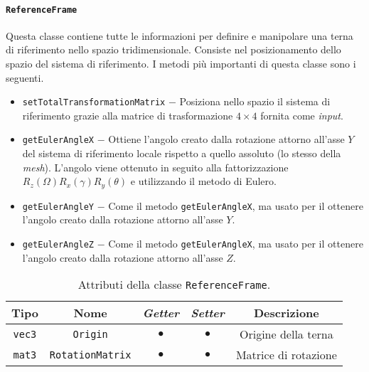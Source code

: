 \paragraph{\texttt{ReferenceFrame}}
Questa classe contiene tutte le informazioni per definire e manipolare una terna di riferimento nello spazio tridimensionale. Consiste nel posizionamento dello spazio del sistema di riferimento. I metodi più importanti di questa classe sono i seguenti.
\begin{itemize}
	\item \texttt{setTotalTransformationMatrix} $-$ Posiziona nello spazio il sistema di riferimento grazie alla matrice di trasformazione $4\times4$ fornita come \textit{input}.
	\item \texttt{getEulerAngleX} $-$ Ottiene l'angolo creato dalla rotazione attorno all'asse $Y$ del sistema di riferimento locale rispetto a quello assoluto (lo stesso della \textit{mesh}). L'angolo viene ottenuto in seguito alla fattorizzazione $R_z(\Omega) R_x(\gamma) R_y(\theta)$ e utilizzando il metodo di Eulero.
	\item \texttt{getEulerAngleY} $-$ Come il metodo \texttt{getEulerAngleX}, ma usato per il ottenere l'angolo creato dalla rotazione attorno all'asse $Y$.
	\item \texttt{getEulerAngleZ} $-$ Come il metodo \texttt{getEulerAngleX}, ma usato per il ottenere l'angolo creato dalla rotazione attorno all'asse $Z$.
\end{itemize}
\begin{table}[h!]
	\centering
	\begin{tabular}{|c|c|c|c|c|}
		\hline 
		\textbf{Tipo} & \textbf{Nome} & \textit{\textbf{Getter}} & \textit{\textbf{Setter}} & \textbf{Descrizione} \\ \hline 
		\texttt{vec3} & \texttt{Origin} & $\bullet$ & $\bullet$ & Origine della terna \\ \hline 
		\texttt{mat3} & \texttt{RotationMatrix} & $\bullet$ & $\bullet$ & Matrice di rotazione \\ \hline
	\end{tabular}
	\caption{Attributi della classe \texttt{ReferenceFrame}.}
	\label{}
\end{table}
%
%
